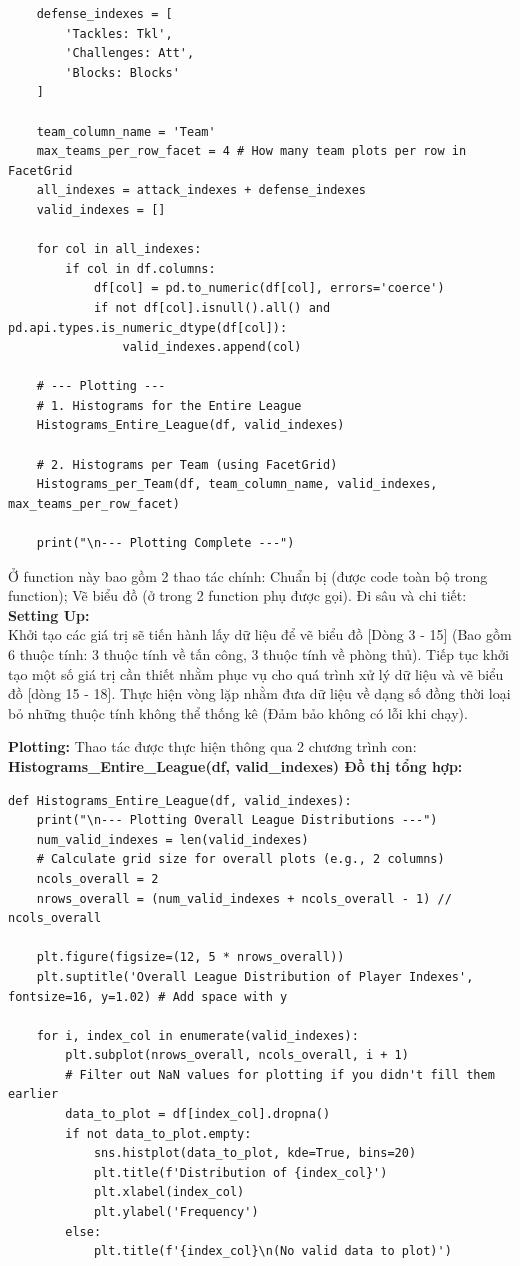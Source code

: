 \documentclass[12pt]{report}
\begin{document}
{\begin{lstlisting}
    defense_indexes = [
        'Tackles: Tkl', 
        'Challenges: Att', 
        'Blocks: Blocks'   
    ]

    team_column_name = 'Team'
    max_teams_per_row_facet = 4 # How many team plots per row in FacetGrid
    all_indexes = attack_indexes + defense_indexes
    valid_indexes = []

    for col in all_indexes:
        if col in df.columns:
            df[col] = pd.to_numeric(df[col], errors='coerce')
            if not df[col].isnull().all() and pd.api.types.is_numeric_dtype(df[col]):
                valid_indexes.append(col)

    # --- Plotting ---
    # 1. Histograms for the Entire League
    Histograms_Entire_League(df, valid_indexes)
    
    # 2. Histograms per Team (using FacetGrid)
    Histograms_per_Team(df, team_column_name, valid_indexes, max_teams_per_row_facet)
    
    print("\n--- Plotting Complete ---")
\end{lstlisting}
Ở function này bao gồm 2 thao tác chính: Chuẩn bị (được code toàn bộ trong function); Vẽ biểu đồ (ở trong 2 function phụ được gọi). Đi sâu và chi tiết:\\
\textbf{Setting Up:}\\
Khởi tạo các giá trị sẽ tiến hành lấy dữ liệu để vẽ biểu đồ [Dòng 3 - 15] (Bao gồm 6 thuộc tính: 3 thuộc tính về tấn công, 3 thuộc tính về phòng thủ). Tiếp tục khởi tạo một số giá trị cần thiết nhằm phục vụ cho quá trình xử lý dữ liệu và vẽ biểu đồ [dòng 15 - 18]. Thực hiện vòng lặp nhằm đưa dữ liệu về dạng số đồng thời loại bỏ những thuộc tính không thể thống kê (Đảm bảo không có lỗi khi chạy).

\textbf{Plotting:} Thao tác được thực hiện thông qua 2 chương trình con:\\
\textbf* {Histograms\_Entire\_League(df, valid\_indexes) Đồ thị tổng hợp: }
\begin{lstlisting}
def Histograms_Entire_League(df, valid_indexes):
    print("\n--- Plotting Overall League Distributions ---")
    num_valid_indexes = len(valid_indexes)
    # Calculate grid size for overall plots (e.g., 2 columns)
    ncols_overall = 2
    nrows_overall = (num_valid_indexes + ncols_overall - 1) // ncols_overall

    plt.figure(figsize=(12, 5 * nrows_overall))
    plt.suptitle('Overall League Distribution of Player Indexes', fontsize=16, y=1.02) # Add space with y

    for i, index_col in enumerate(valid_indexes):
        plt.subplot(nrows_overall, ncols_overall, i + 1)
        # Filter out NaN values for plotting if you didn't fill them earlier
        data_to_plot = df[index_col].dropna()
        if not data_to_plot.empty:
            sns.histplot(data_to_plot, kde=True, bins=20)
            plt.title(f'Distribution of {index_col}')
            plt.xlabel(index_col)
            plt.ylabel('Frequency')
        else:
            plt.title(f'{index_col}\n(No valid data to plot)')


\end{lstlisting}}
\end{document}
